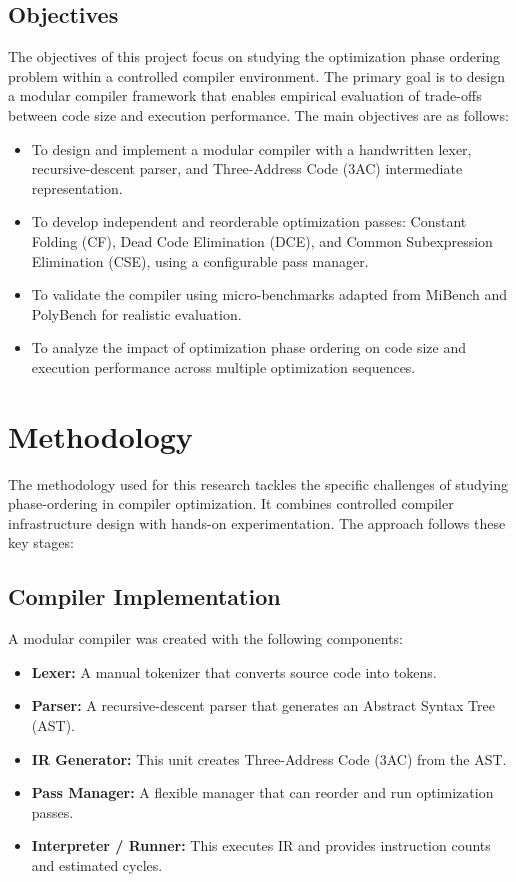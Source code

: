 \documentclass[conference]{IEEEtran}
\begin{document}
\subsection{Objectives}
The objectives of this project focus on studying the optimization phase ordering problem within a controlled compiler environment. The primary goal is to design a modular compiler framework that enables empirical evaluation of trade-offs between code size and execution performance. The main objectives are as follows:
\begin{itemize}
    \item To design and implement a modular compiler with a handwritten lexer, recursive-descent parser, and Three-Address Code (3AC) intermediate representation.
    \item To develop independent and reorderable optimization passes: Constant Folding (CF), Dead Code Elimination (DCE), and Common Subexpression Elimination (CSE), using a configurable pass manager.
    \item To validate the compiler using micro-benchmarks adapted from MiBench and PolyBench for realistic evaluation.
    \item To analyze the impact of optimization phase ordering on code size and execution performance across multiple optimization sequences.
\end{itemize}

\section{Methodology}

The methodology used for this research tackles the specific challenges of studying phase-ordering in compiler optimization. It combines controlled compiler infrastructure design with hands-on experimentation. The approach follows these key stages:

\subsection{Compiler Implementation}

A modular compiler was created with the following components:

\begin{itemize}
    \item \textbf{Lexer:} A manual tokenizer that converts source code into tokens.
    \item \textbf{Parser:} A recursive-descent parser that generates an Abstract Syntax Tree (AST).
    \item \textbf{IR Generator:} This unit creates Three-Address Code (3AC) from the AST.
    \item \textbf{Pass Manager:} A flexible manager that can reorder and run optimization passes.
    \item \textbf{Interpreter / Runner:} This executes IR and provides instruction counts and estimated cycles.
\end{itemize}
\end{document}
